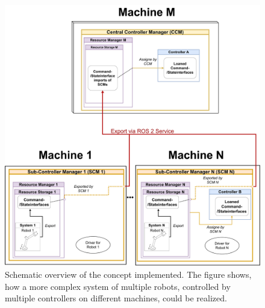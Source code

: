 \begin{figure}[htbp]
	\centering
	\includegraphics[width=1\textwidth]{Figures/C4/distributed_control_with_driver.pdf}
	\caption{Schematic overview of the concept implemented. The figure shows, how a more complex system of multiple robots, controlled by multiple controllers on different machines, could be realized. }
	\label{c4_fig_concept_overview}
\end{figure}
